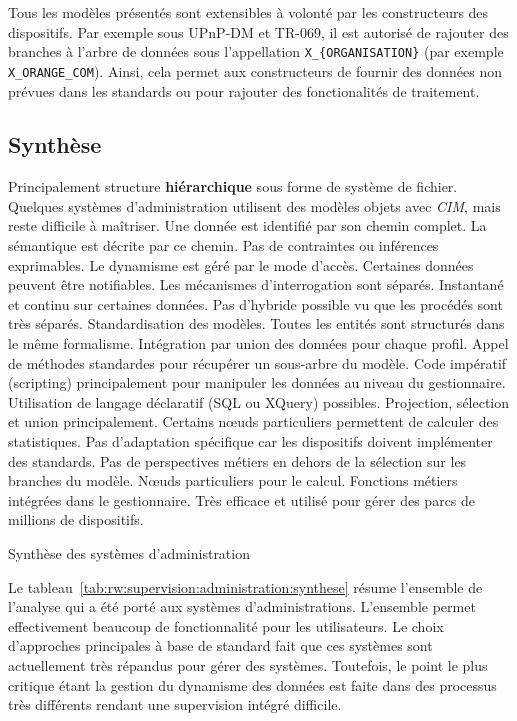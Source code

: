 Tous les modèles présentés sont extensibles à volonté par les constructeurs des dispositifs. Par exemple sous UPnP-DM et TR-069, il est autorisé de rajouter des branches à l'arbre de données sous l'appellation \verb|X_{ORGANISATION}| (par exemple \verb|X_ORANGE_COM|). Ainsi, cela permet aux constructeurs de fournir des données non prévues dans les standards ou pour rajouter des fonctionalités de traitement.

\subsection{Synthèse}

\begin{table}[!ht]
\criteretabDonnee
    {Principalement structure \textbf{hiérarchique} sous forme de système de fichier. Quelques systèmes d'administration utilisent des modèles objets avec \textit{CIM}, mais reste difficile à maîtriser.}
    {Une donnée est identifié par son chemin complet. La sémantique est décrite par ce chemin. Pas de contraintes ou inférences exprimables.}
    {Le dynamisme est géré par le mode d'accès. Certaines données peuvent être notifiables. Les mécanismes d'interrogation sont séparés.}
\criteretabTraitement
    {Instantané et continu sur certaines données. Pas d'hybride possible vu que les procédés sont très séparés.}
    {Standardisation des modèles. Toutes les entités sont structurés dans le même formalisme. Intégration par union des données pour chaque profil.}
    {Appel de méthodes standardes pour récupérer un sous-arbre du modèle. Code impératif (scripting) principalement pour manipuler les données au niveau du gestionnaire. Utilisation de langage déclaratif (SQL ou XQuery) possibles.}
    {Projection, sélection et union principalement. Certains nœuds particuliers permettent de calculer des statistiques.}
\criteretabAdaptabilite
    {Pas d'adaptation spécifique car les dispositifs doivent implémenter des standards.}
    {Pas de perspectives métiers en dehors de la sélection sur les branches du modèle.}
    {Nœuds particuliers pour le calcul. Fonctions métiers intégrées dans le gestionnaire.}
    {Très efficace et utilisé pour gérer des parcs de millions de dispositifs.}
\caption{Synthèse des systèmes d'administration}\label{tab:rw:supervision:administration:synthese}
\end{table}

Le tableau~\ref{tab:rw:supervision:administration:synthese} résume l'ensemble de l'analyse qui a été porté aux systèmes d'administrations. L'ensemble permet effectivement beaucoup de fonctionnalité pour les utilisateurs. Le choix d'approches principales à base de standard fait que ces systèmes sont actuellement très répandus pour gérer des systèmes. Toutefois, le point le plus critique étant la gestion du dynamisme des données est faite dans des processus très différents rendant une supervision intégré difficile.
